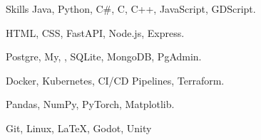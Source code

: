 \begin{rubric}{Skills}
    \entry*[Programming]%
        Java, Python, C\#, C, C++, JavaScript, GDScript.

    \entry*[Web]%
        \textsc{HTML, CSS}, FastAPI, Node.js, Express.

    \entry*[Databases]%
        Postgre, My, , SQLite, MongoDB, PgAdmin.

    \entry*[DevOps]%
        Docker, Kubernetes, CI/CD Pipelines, Terraform.

        Pandas, NumPy, PyTorch, Matplotlib.

        Git, Linux, LaTeX, Godot, Unity
\end{rubric}
